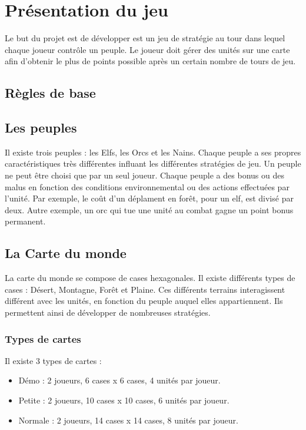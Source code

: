 
\section{Présentation du jeu}
Le but du projet est de développer est un jeu de stratégie au tour dans lequel chaque joueur contrôle un peuple. Le joueur doit gérer des unités sur une carte afin d'obtenir le plus de points possible après un certain nombre de tours de jeu.
\subsection{Règles de base}
\subsection{Les peuples}
Il existe trois peuples : les Elfs, les Orcs et les Nains. Chaque peuple a ses propres caractéristiques très différentes influant les différentes stratégies de jeu. Un peuple ne peut être choisi que par un seul joueur.
Chaque peuple a des bonus ou des malus en fonction des conditions environnemental ou des actions effectuées par l'unité. Par exemple, le coût d'un déplament en forêt, pour un elf, est divisé par deux. Autre exemple, un orc qui tue une unité au combat gagne un point bonus permanent.

\subsection{La Carte du monde}
La carte du monde se compose de cases hexagonales. Il existe différents types de cases : Désert, Montagne, Forêt et Plaine. Ces différents terrains interagissent différent avec les unités, en fonction du peuple auquel elles appartiennent. Ils permettent ainsi de développer de nombreuses stratégies.

\subsubsection{Types de cartes}
Il existe 3 types de cartes :
\begin{itemize}
  \item Démo : 2 joueurs, 6 cases x 6 cases, 4 unités par joueur.
  \item Petite : 2 joueurs, 10 cases x 10 cases, 6 unités par joueur.
  \item Normale :  2 joueurs, 14 cases x 14 cases, 8 unités par joueur.
\end{itemize}

